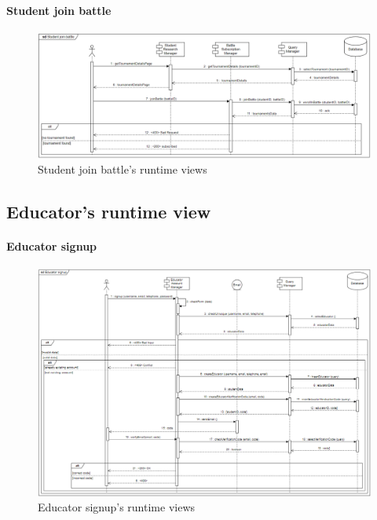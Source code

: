 \documentclass[12pt, a4paper]{report}
\begin{document}
    \paragraph*{Student join battle}
    \begin{figure}[H]
        \centering
        \includegraphics[width=1.0\linewidth]{images/sjbrv.png}
        \caption{Student join battle's runtime views}
    \end{figure}















    \subsection{Educator's runtime view}
    \paragraph*{Educator signup}
    \begin{figure}[H]
        \centering
        \includegraphics[width=1.0\linewidth]{images/esrv.png}
        \caption{Educator signup's runtime views}
    \end{figure}
\end{document}
